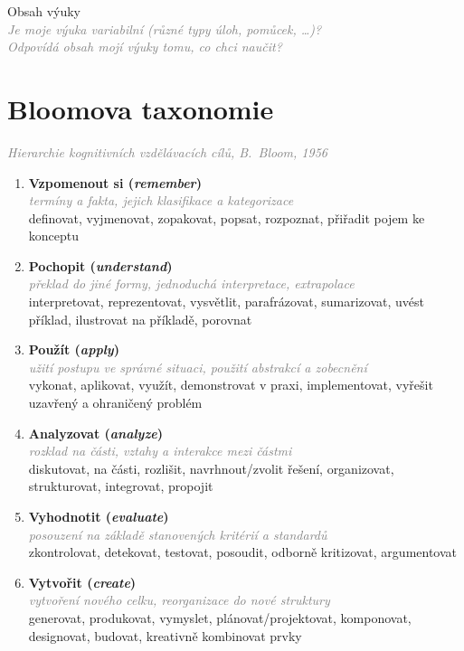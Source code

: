 \documentclass[twoside,openany]{book}
\newcommand{\note}[1]{\textcolor{gray}{\small\itshape #1}}
\begin{document}
Obsah výuky\\
\note{Je moje výuka variabilní (různé typy úloh, pomůcek, \dots)?\\
Odpovídá obsah mojí výuky tomu, co chci naučit?}

\newpage

\chapter*{Bloomova taxonomie}
\label{bloom}
\vspace{-0.5em}
\note{Hierarchie kognitivních vzdělávacích cílů, B.\ Bloom, 1956}
\vspace{-0.3em}

\begin{enumerate}[leftmargin=*]
\item \textbf{Vzpomenout si (\textit{remember})}\\
\note{termíny a fakta, jejich klasifikace a kategorizace}\\
{\small definovat, vyjmenovat, zopakovat, popsat, rozpoznat, přiřadit pojem ke konceptu}

\item \textbf{Pochopit (\textit{understand})}\\
\note{překlad do jiné formy, jednoduchá interpretace, extrapolace}\\
{\small interpretovat, reprezentovat, vysvětlit, parafrázovat, sumarizovat, uvést příklad, ilustrovat na příkladě, porovnat}

\item \textbf{Použít (\textit{apply})}\\
\note{užití postupu ve správné situaci, použití abstrakcí a zobecnění}\\
{\small vykonat, aplikovat, využít, demonstrovat v praxi, implementovat, vyřešit uzavřený a ohraničený problém}

\item \textbf{Analyzovat (\textit{analyze})}\\
\note{rozklad na části, vztahy a interakce mezi částmi}\\
{\small diskutovat,  na části, rozlišit, navrhnout/zvolit řešení, organizovat, strukturovat, integrovat, propojit}

\item \textbf{Vyhodnotit (\textit{evaluate})}\\
\note{posouzení na základě stanovených kritérií a standardů}\\
{\small zkontrolovat, detekovat, testovat, posoudit, odborně kritizovat, argumentovat}

\item \textbf{Vytvořit (\textit{create})}\\
\note{vytvoření nového celku, reorganizace do nové struktury}\\
{\small generovat, produkovat, vymyslet, plánovat/projektovat, komponovat, designovat, budovat, kreativně kombinovat prvky}
\end{enumerate}
\end{document}
